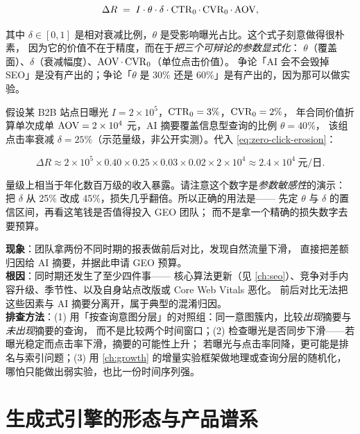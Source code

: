 \begin{equation}
\Delta R \;=\; I \cdot \theta \cdot \delta \cdot \operatorname{CTR}_0 \cdot \operatorname{CVR}_0 \cdot \operatorname{AOV} ,
\label{eq:zero-click-erosion}
\end{equation}

其中 $\delta \in [0,1]$ 是相对衰减比例，$\theta$ 是受影响曝光占比。这个式子刻意做得很朴素，
因为它的价值不在于精度，而在于\emph{把三个可辩论的参数显式化}：
$\theta$（覆盖面）、$\delta$（衰减幅度）、$\operatorname{AOV} \cdot \operatorname{CVR}_0$（单位点击价值）。
争论「AI 会不会毁掉 SEO」是没有产出的；争论「$\theta$ 是 30\% 还是 60\%」是有产出的，因为那可以做实验。

\begin{example}
假设某 B2B 站点日曝光 $I = 2\times 10^{5}$，$\operatorname{CTR}_0 = 3\%$，$\operatorname{CVR}_0 = 2\%$，
年合同价值折算单次成单 $\operatorname{AOV} = 2\times 10^{4}$ 元，AI 摘要覆盖信息型查询的比例 $\theta = 40\%$，
该组点击率衰减 $\delta = 25\%$（示范量级，非公开实测）。代入 \cref{eq:zero-click-erosion}：

\[
\Delta R \approx 2\times 10^{5} \times 0.40 \times 0.25 \times 0.03 \times 0.02 \times 2\times 10^{4}
\approx 2.4\times 10^{4} \ \text{元/日} .
\]

量级上相当于年化数百万级的收入暴露。请注意这个数字是\emph{参数敏感性}的演示：
把 $\delta$ 从 25\% 改成 45\%，损失几乎翻倍。所以正确的用法是——
先定 $\theta$ 与 $\delta$ 的置信区间，再看这笔钱是否值得投入 GEO 团队；
而不是拿一个精确的损失数字去要预算。
\end{example}

\begin{pitfall}
\textbf{现象}：团队拿两份不同时期的报表做前后对比，发现自然流量下滑，
直接把差额归因给 AI 摘要，并据此申请 GEO 预算。\\
\textbf{根因}：同时期还发生了至少四件事——
核心算法更新（见 \cref{ch:seo}）、竞争对手内容升级、季节性、以及自身站点改版或 Core Web Vitals 恶化。
前后对比无法把这些因素与 AI 摘要分离开，属于典型的混淆归因。\\
\textbf{排查方法}：(1) 用「按查询意图分层」的对照组：同一意图簇内，比较\emph{出现}摘要与\emph{未出现}摘要的查询，
而不是比较两个时间窗口；(2) 检查曝光是否同步下滑——若曝光稳定而点击率下滑，摘要的可能性上升；
若曝光与点击率同降，更可能是排名与索引问题；(3) 用 \cref{ch:growth} 的增量实验框架做地理或查询分层的随机化，
哪怕只能做出弱实验，也比一份时间序列强。
\end{pitfall}

\section{生成式引擎的形态与产品谱系}

